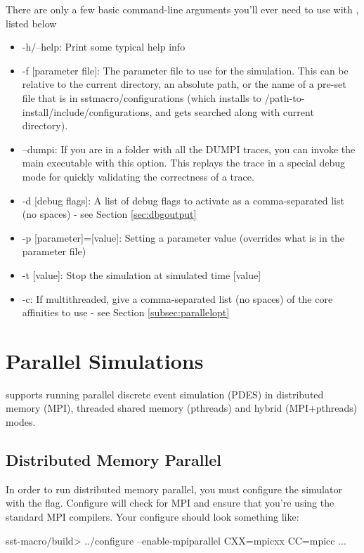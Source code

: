 There are only a few basic command-line arguments you'll ever need to use with \sstmacro, listed below

\begin{itemize}
\item -h/--help: Print some typical help info
\item -f [parameter file]: The parameter file to use for the simulation.  
This can be relative to the current directory, an absolute path, or the name of a pre-set file that is in sstmacro/configurations 
(which installs to /path-to-install/include/configurations, and gets searched along with current directory). 
\item --dumpi: If you are in a folder with all the DUMPI traces, you can invoke the main  executable with this option.  This replays the trace in a special debug mode for quickly validating the correctness of a trace.
\item -d [debug flags]: A list of debug flags to activate as a comma-separated list (no spaces) - see Section \ref{sec:dbgoutput}
\item -p [parameter]=[value]: Setting a parameter value (overrides what is in the parameter file)
\item -t [value]: Stop the simulation at simulated time [value]
\item -c: If multithreaded, give a comma-separated list (no spaces) of the core affinities to use - see Section \ref{subsec:parallelopt}
\end{itemize}

\section{Parallel Simulations}
\label{sec:PDES}

\sstmacro supports running parallel discrete event simulation (PDES) in distributed memory (MPI), threaded shared memory (pthreads) and hybrid (MPI+pthreads) modes.  

\subsection{Distributed Memory Parallel}
\label{subsec:mpiparallel}
In order to run distributed memory parallel, you must configure the simulator with the  flag.
Configure will check for MPI and ensure that you're using
the standard MPI compilers.  Your configure should look something like:

\begin{ShellCmd}
sst-macro/build> ../configure --enable-mpiparallel CXX=mpicxx CC=mpicc ...
\end{ShellCmd}

